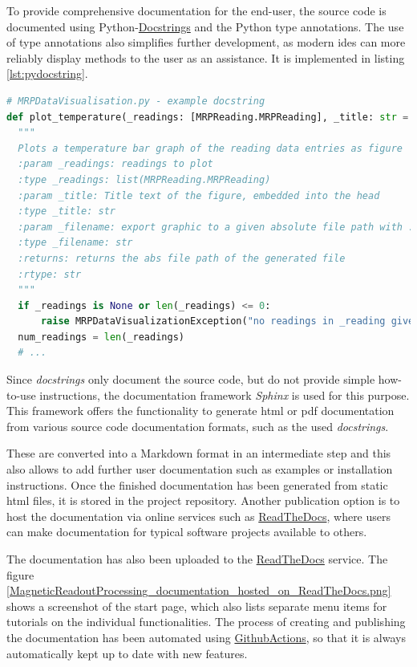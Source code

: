 To provide comprehensive documentation for the end-user, the source code
is documented using
Python-\href{https://peps.python.org/pep-0257/}{Docstrings} and the
Python type annotations. The use of type annotations also simplifies
further development, as modern \gls{ide}s can more reliably display
methods to the user as an assistance. It is implemented in listing
\ref{lst:pydocstring}.

\newpage

\begin{lstlisting}[language=Python, caption={Documentation using Python docstring example}, label=lst:pydocstring]
# MRPDataVisualisation.py - example docstring
def plot_temperature(_readings: [MRPReading.MRPReading], _title: str = '', _filename: str = None, _unit: str = "degree C") -> str:
  """
  Plots a temperature bar graph of the reading data entries as figure
  :param _readings: readings to plot
  :type _readings: list(MRPReading.MRPReading)
  :param _title: Title text of the figure, embedded into the head
  :type _title: str
  :param _filename: export graphic to a given absolute file path with .png
  :type _filename: str
  :returns: returns the abs file path of the generated file
  :rtype: str
  """
  if _readings is None or len(_readings) <= 0:
      raise MRPDataVisualizationException("no readings in _reading given")
  num_readings = len(_readings)
  # ...
\end{lstlisting}

Since \emph{docstrings} only document the source code, but do not
provide simple how-to-use instructions, the documentation framework
\emph{Sphinx}  is used for this purpose. This framework
offers the functionality to generate \gls{html} or \gls{pdf}
documentation from various source code documentation formats, such as
the used \emph{docstrings}.

These are converted into a Markdown format in an intermediate step and
this also allows to add further user documentation such as examples or
installation instructions. Once the finished documentation has been
generated from static \gls{html} files, it is stored in the project
repository. Another publication option is to host the documentation via
online services such as \href{https://readthedocs.com}{ReadTheDocs},
where users can make documentation for typical software projects
available to others.

The documentation has also been uploaded to the
\href{https://magneticreadoutprocessing.readthedocs.io/}{ReadTheDocs}
service. The figure
\ref{MagneticReadoutProcessing_documentation_hosted_on_ReadTheDocs.png}
shows a screenshot of the start page, which also lists separate menu
items for tutorials on the individual functionalities. The process of
creating and publishing the documentation has been automated using
\href{https://github.com/features/actions}{GithubActions}, so that it is
always automatically kept up to date with new features.

